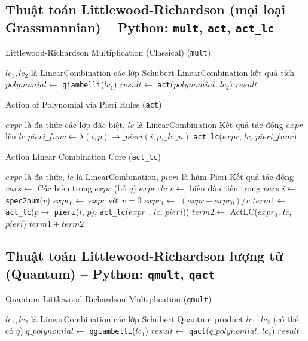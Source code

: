 
\subsection*{Thuật toán Littlewood-Richardson (mọi loại Grassmannian) -- Python: \texttt{mult}, \texttt{act}, \texttt{act\_lc}}

\begin{algorithm}[H]
\caption{Littlewood-Richardson Multiplication (Classical) (\texttt{mult})}
\begin{algorithmic}[1]
\REQUIRE $lc_1, lc_2$ là LinearCombination các lớp Schubert
\ENSURE LinearCombination kết quả tích
\STATE $polynomial \gets$ \texttt{giambelli}($lc_1$)
\STATE $result \gets$ \texttt{act}($polynomial$, $lc_2$)
\RETURN $result$
\end{algorithmic}
\end{algorithm}

\begin{algorithm}[H]
\caption{Action of Polynomial via Pieri Rules (\texttt{act})}
\begin{algorithmic}[1]
\REQUIRE $expr$ là đa thức các lớp đặc biệt, $lc$ là LinearCombination
\ENSURE Kết quả tác động $expr$ lên $lc$
\STATE $pieri\_func \gets \lambda(i,p) \to \_pieri(i, p, \_k, \_n)$
\RETURN \texttt{act\_lc}($expr$, $lc$, $pieri\_func$)
\end{algorithmic}
\end{algorithm}

\begin{algorithm}[H]
\caption{Action Linear Combination Core (\texttt{act\_lc})}
\begin{algorithmic}[1]
\REQUIRE $expr$ là đa thức, $lc$ là LinearCombination, $pieri$ là hàm Pieri
\ENSURE Kết quả tác động
\STATE $vars \gets$ Các biến trong $expr$ (bỏ $q$)
    \RETURN $expr \cdot lc$
\ENDIF
\STATE $v \gets$ biến đầu tiên trong $vars$
\STATE $i \gets$ \texttt{spec2num}($v$)
\STATE $expr_0 \gets$ $expr$ với $v=0$
\STATE $expr_1 \gets$ $(expr - expr_0)/v$
\STATE $term1 \gets$ \texttt{act\_lc}($p \to$ \texttt{pieri}($i$, $p$), \texttt{act\_lc}($expr_1$, $lc$, $pieri$))
\STATE $term2 \gets$ ActLC($expr_0$, $lc$, $pieri$)
\RETURN $term1 + term2$
\end{algorithmic}
\end{algorithm}

\subsection*{Thuật toán Littlewood-Richardson lượng tử (Quantum) -- Python: \texttt{qmult}, \texttt{qact}}

\begin{algorithm}[H]
\caption{Quantum Littlewood-Richardson Multiplication (\texttt{qmult})}
\begin{algorithmic}[1]
\REQUIRE $lc_1, lc_2$ là LinearCombination các lớp Schubert
\ENSURE Quantum product $lc_1 \cdot lc_2$ (có thể có $q$)
\STATE $q\_polynomial \gets$ \texttt{qgiambelli}($lc_1$)
\STATE $result \gets$ \texttt{qact}($q\_polynomial$, $lc_2$)
\RETURN $result$
\end{algorithmic}
\end{algorithm}